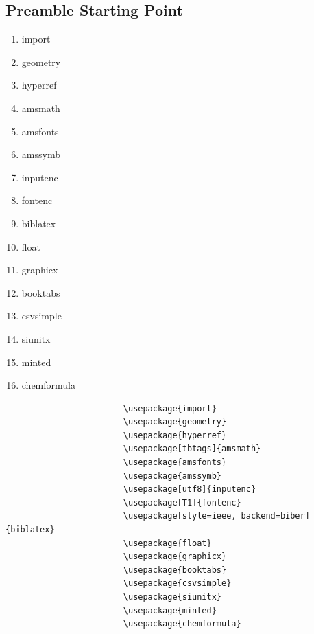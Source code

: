 \documentclass[titlepage, hidelinks, 12pt]{article}%
\begin{document}
        \subsection{Preamble Starting Point}
                \begin{minipage}{0.4\linewidth}%
                    \begin{enumerate}
                        \item import
                        \item geometry
                        \item hyperref
                        \item amsmath
                        \item amsfonts
                        \item amssymb
                        \item inputenc
                        \item fontenc
                        \item biblatex
                        \item float
                        \item graphicx
                        \item booktabs
                        \item csvsimple
                        \item siunitx
                        \item minted
                        \item chemformula
                    \end{enumerate}
                \end{minipage}
                \begin{minipage}{0.6\linewidth}%
                    \begin{verbatim}
                        \usepackage{import}
                        \usepackage{geometry}
                        \usepackage{hyperref}
                        \usepackage[tbtags]{amsmath}
                        \usepackage{amsfonts}
                        \usepackage{amssymb}
                        \usepackage[utf8]{inputenc}
                        \usepackage[T1]{fontenc}
                        \usepackage[style=ieee, backend=biber]{biblatex}
                        \usepackage{float}
                        \usepackage{graphicx}
                        \usepackage{booktabs}
                        \usepackage{csvsimple}
                        \usepackage{siunitx}
                        \usepackage{minted}
                        \usepackage{chemformula}
                    \end{verbatim}
                \end{minipage}
\end{document}
